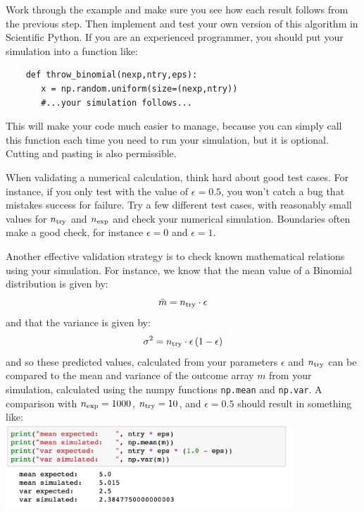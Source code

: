Work through the example and make sure you see how each result follows
from the previous step.  Then implement and test your own version of
this algorithm in Scientific Python.  If you are an experienced
programmer, you should put your simulation into a function like:
\begin{verbatim}
    def throw_binomial(nexp,ntry,eps):
       x = np.random.uniform(size=(nexp,ntry))
       #...your simulation follows...    
\end{verbatim}
This will make your code much easier to manage, because you can simply call this function each time you need to run your simulation, but it is optional.  Cutting and pasting is also permissible.


When validating a numerical calculation, think hard about good test
cases.  For instance, if you only test with the value of $\epsilon =
0.5$, you won't catch a bug that mistakes success for failure.  Try a
few different test cases, with reasonably small values for $n_{\rm
  try}$ and $n_{\rm exp}$ and check your numerical simulation.
Boundaries often make a good check, for instance $\epsilon = 0$ and
$\epsilon = 1$.

Another effective validation strategy is to check known mathematical
relations using your simulation.  For instance, we know that the mean
value of a Binomial distribution is given by:
\begin{equation} \label{eqn:binom_mean}
\bar{m} = n_{\rm try} \cdot \epsilon
\end{equation}
and that the variance is given by:
\begin{equation} \label{eqn:binom_var}
\sigma^2 = n_{\rm try} \cdot \epsilon \, (1 - \epsilon)
\end{equation}
and so these predicted values, calculated from your parameters
$\epsilon$ and $n_{\rm try}$ can be compared to the mean and variance
of the outcome array $m$ from your simulation, calculated using the numpy functions {\tt np.mean} and {\tt np.var}.  A
comparison with $n_{\rm exp}=1000$, $n_{\rm try}=10$, and
$\epsilon=0.5$ should result in something like:\\
\includegraphics[width=0.8\textwidth]{figs/labs/distributions/validate.png}\\ 


